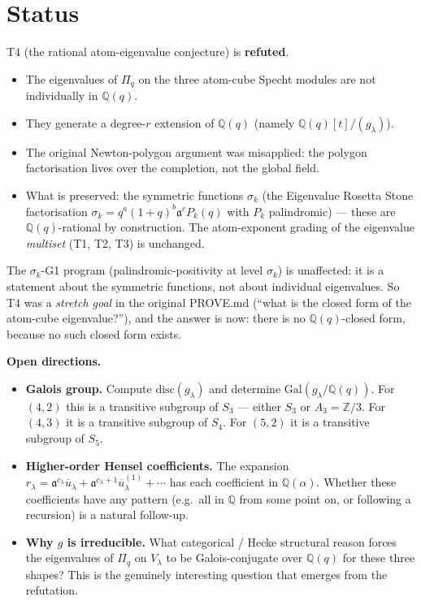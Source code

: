 \documentclass[11pt]{article}
\theoremstyle{remark}
\begin{document}
\section{Status}

T4 (the rational atom-eigenvalue conjecture) is \textbf{refuted}.

\begin{itemize}
\item The eigenvalues of $\Pi_q$ on the three atom-cube Specht modules
  are not individually in $\mathbb{Q}(q)$.
\item They generate a degree-$r$ extension of $\mathbb{Q}(q)$ (namely
  $\mathbb{Q}(q)[t]/(g_\lambda)$).
\item The original Newton-polygon argument was misapplied: the polygon
  factorisation lives over the completion, not the global field.
\item What is preserved: the symmetric functions $\sigma_k$ (the
  Eigenvalue Rosetta Stone factorisation $\sigma_k = q^a(1+q)^b
  \mathfrak{a}^c P_k(q)$ with $P_k$ palindromic) — these are
  $\mathbb{Q}(q)$-rational by construction. The atom-exponent grading
  of the eigenvalue \emph{multiset} (T1, T2, T3) is unchanged.
\end{itemize}

The $\sigma_k$-G1 program (palindromic-positivity at level
$\sigma_k$) is unaffected: it is a statement about the symmetric
functions, not about individual eigenvalues. So T4 was a \emph{stretch
goal} in the original PROVE.md (``what is the closed form of the
atom-cube eigenvalue?''), and the answer is now: there is no
$\mathbb{Q}(q)$-closed form, because no such closed form exists.

\medskip

\noindent\textbf{Open directions.}
\begin{itemize}
\item \textbf{Galois group.} Compute $\mathrm{disc}(g_\lambda)$ and
  determine $\mathrm{Gal}(g_\lambda/\mathbb{Q}(q))$. For $(4,2)$ this
  is a transitive subgroup of $S_3$ — either $S_3$ or $A_3 = \mathbb{Z}/3$.
  For $(4,3)$ it is a transitive subgroup of $S_4$. For $(5,2)$ it is
  a transitive subgroup of $S_5$.
\item \textbf{Higher-order Hensel coefficients.} The expansion
  $r_\lambda = \mathfrak{a}^{c_\lambda} \overline{u}_\lambda + \mathfrak{a}^{c_\lambda+1} \overline{u}^{(1)}_\lambda + \cdots$
  has each coefficient in $\mathbb{Q}(\alpha)$. Whether these
  coefficients have any pattern (e.g.\ all in $\mathbb{Q}$ from some
  point on, or following a recursion) is a natural follow-up.
\item \textbf{Why $g$ is irreducible.} What categorical / Hecke
  structural reason forces the eigenvalues of $\Pi_q$ on $V_\lambda$ to
  be Galois-conjugate over $\mathbb{Q}(q)$ for these three shapes? This
  is the genuinely interesting question that emerges from the
  refutation.
\end{itemize}
\end{document}
